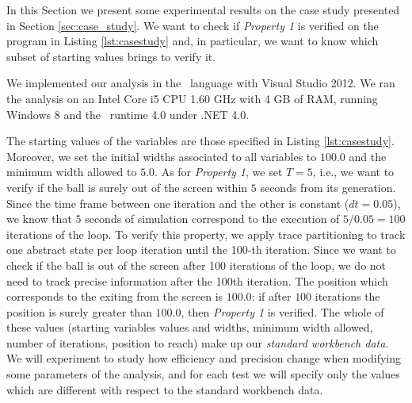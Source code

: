 In this Section we present some experimental results on the case study presented in Section \ref{sec:case_study}. We want to check if \emph{Property 1} is verified on the program in Listing \ref{lst:casestudy} and, in particular, we want to know which subset of starting values brings to verify it.

We implemented our analysis in the \FSharp\ language with Visual Studio 2012. We ran the analysis on an Intel Core i5 CPU 1.60 GHz with 4 GB of RAM, running Windows 8 and the \FSharp\ runtime 4.0 under .NET 4.0. 

The starting values of the variables are those specified in Listing \ref{lst:casestudy}. Moreover, we set the initial widths associated to all variables to $100.0$ and the minimum width allowed to $5.0$. As for \emph{Property 1}, we set $T = 5$, i.e., we want to verify if the ball is surely out of the screen within $5$ seconds from its generation. Since the time frame between one iteration and the other is constant ($dt=0.05$), we know that $5$ seconds of simulation correspond to the execution of $5/0.05 = 100$ iterations of the  loop. To verify this property, we apply trace partitioning \cite{MR05} to track one abstract state per loop iteration until the 100-th iteration. Since we want to check if the ball is out of the screen after 100 iterations of the loop, we do not need to track precise information after the 100th iteration. The position which corresponds to the exiting from the screen is $100.0$: if after $100$ iterations the position  is surely greater than $100.0$, then \emph{Property 1} is verified. The whole of these values (starting variables values and widths, minimum width allowed, number of iterations, position to reach) make up our \emph{standard workbench data}. We will experiment to study how efficiency and precision change when modifying some parameters of the analysis, and for each test we will specify only the values which are different with respect to the standard workbench data.


